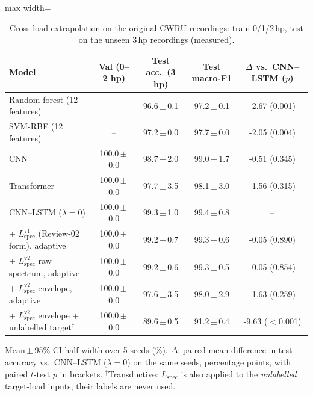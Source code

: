 \documentclass[conference]{IEEEtran}
\begin{document}
\begin{table}[t]
\caption{Cross-load extrapolation on the original CWRU recordings: train 0/1/2\,hp, test on the unseen 3\,hp recordings (measured).}
\label{tab:xload}
\centering
\footnotesize
\begin{adjustbox}{max width=\textwidth}
\begin{tabular}{lcccc}
\toprule
Model & Val (0--2 hp) & Test acc.\ (3 hp) & Test macro-F1 & $\Delta$ vs.\ CNN--LSTM ($p$) \\
\midrule
Random forest (12 features) & -- & 96.6\,$\pm$\,0.1 & 97.2\,$\pm$\,0.1 & -2.67 (0.001) \\
SVM-RBF (12 features) & -- & 97.2\,$\pm$\,0.0 & 97.7\,$\pm$\,0.0 & -2.05 (0.004) \\
CNN & 100.0\,$\pm$\,0.0 & 98.7\,$\pm$\,2.0 & 99.0\,$\pm$\,1.7 & -0.51 (0.345) \\
Transformer & 100.0\,$\pm$\,0.0 & 97.7\,$\pm$\,3.5 & 98.1\,$\pm$\,3.0 & -1.56 (0.315) \\
CNN--LSTM ($\lambda=0$) & 100.0\,$\pm$\,0.0 & 99.3\,$\pm$\,1.0 & 99.4\,$\pm$\,0.8 & -- \\
\midrule
+ $L_{\mathrm{spec}}^{\mathrm{v1}}$ (Review-02 form), adaptive & 100.0\,$\pm$\,0.0 & 99.2\,$\pm$\,0.7 & 99.3\,$\pm$\,0.6 & -0.05 (0.890) \\
+ $L_{\mathrm{spec}}^{\mathrm{v2}}$ raw spectrum, adaptive & 100.0\,$\pm$\,0.0 & 99.2\,$\pm$\,0.6 & 99.3\,$\pm$\,0.5 & -0.05 (0.854) \\
+ $L_{\mathrm{spec}}^{\mathrm{v2}}$ envelope, adaptive & 100.0\,$\pm$\,0.0 & 97.6\,$\pm$\,3.5 & 98.0\,$\pm$\,2.9 & -1.63 (0.259) \\
+ $L_{\mathrm{spec}}^{\mathrm{v2}}$ envelope + unlabelled target$^{\dagger}$ & 100.0\,$\pm$\,0.0 & 89.6\,$\pm$\,0.5 & 91.2\,$\pm$\,0.4 & -9.63 ($<$0.001) \\
\bottomrule
\end{tabular}
\end{adjustbox}
\par\vspace{2pt}\parbox{0.95\textwidth}{\scriptsize Mean\,$\pm$\,95\% CI half-width over 5 seeds (\%). $\Delta$: paired mean difference in test accuracy vs.\ CNN--LSTM ($\lambda=0$) on the same seeds, percentage points, with paired $t$-test $p$ in brackets. $^{\dagger}$Transductive: $L_{\mathrm{spec}}$ is also applied to the \emph{unlabelled} target-load inputs; their labels are never used.}
\end{table}
\end{document}

